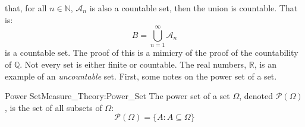 \documentclass[crop=false,class=book,oneside]{standalone}
\begin{document}
            that, for all $n\in\mathbb{N}$, $\mathcal{A}_{n}$ is
            also a countable set, then the union is countable. That is:
            \begin{equation}
                B=\bigcup_{n=1}^{\infty}\mathcal{A}_{n}
            \end{equation}
            is a countable set. The proof of this is a mimicry of
            the proof of the countability of $\mathbb{Q}$. Not
            every set is either finite or countable. The real numbers,
            $\mathbb{R}$, is an example of an \textit{uncountable}
            set. First, some notes on the power set of a set.
            \begin{ldefinition}{Power Set}{Measure_Theory:Power_Set}
                The power set of a set $\Omega$, denoted
                $\mathcal{P}(\Omega)$, is the set of all subsets of
                $\Omega$:
                \begin{equation}
                    \mathcal{P}(\Omega)=
                    \{A:A\subseteq\Omega\}
                \end{equation}
            \end{ldefinition}
\end{document}
